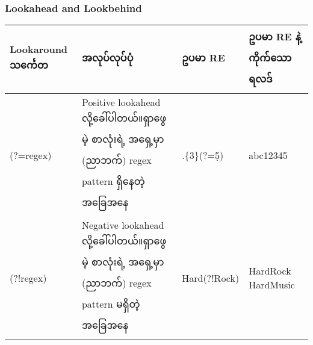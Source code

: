 \documentclass[11pt]{article}
\begin{document}
    \subsubsection{Lookahead and Lookbehind}\label{lookahead-and-lookbehind}

\begin{longtable}[c]{@{}llll@{}}
\toprule
\begin{minipage}[b]{0.12\columnwidth}\raggedright\strut
Lookaround သင်္ကေတ
\strut\end{minipage} &
\begin{minipage}[b]{0.15\columnwidth}\raggedright\strut
အလုပ်လုပ်ပုံ
\strut\end{minipage} &
\begin{minipage}[b]{0.12\columnwidth}\raggedright\strut
ဥပမာ RE
\strut\end{minipage} &
\begin{minipage}[b]{0.12\columnwidth}\raggedright\strut
ဥပမာ RE နဲ့ ကိုက်သောရလဒ်
\strut\end{minipage}\tabularnewline
\midrule
\endhead
\begin{minipage}[t]{0.12\columnwidth}\raggedright\strut
(?=regex)
\strut\end{minipage} &
\begin{minipage}[t]{0.15\columnwidth}\raggedright\strut
Positive lookahead လို့ခေါ်ပါတယ်။ရှာဖွေမဲ့ စာလုံးရဲ့ အရှေ့မှာ (ညာဘက်)
regex pattern ရှိနေတဲ့ အခြေအနေ
\strut\end{minipage} &
\begin{minipage}[t]{0.12\columnwidth}\raggedright\strut
.\{3\}(?=\d{5})
\strut\end{minipage} &
\begin{minipage}[t]{0.12\columnwidth}\raggedright\strut
{abc}12345
\strut\end{minipage}\tabularnewline
\begin{minipage}[t]{0.12\columnwidth}\raggedright\strut
(?!regex)
\strut\end{minipage} &
\begin{minipage}[t]{0.15\columnwidth}\raggedright\strut
Negative lookahead လို့ခေါ်ပါတယ်။ရှာဖွေမဲ့ စာလုံးရဲ့ အရှေ့မှာ (ညာဘက်)
regex pattern မရှိတဲ့ အခြေအနေ
\strut\end{minipage} &
\begin{minipage}[t]{0.12\columnwidth}\raggedright\strut
Hard(?!Rock)
\strut\end{minipage} &
\begin{minipage}[t]{0.12\columnwidth}\raggedright\strut
HardRock {Hard}Music
\strut\end{minipage}\tabularnewline

\end{longtable}
\end{document}
